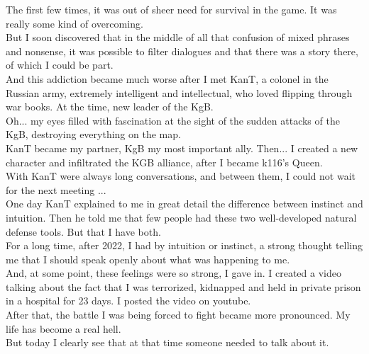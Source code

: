 \documentclass[11pt]{book}
\begin{document}
 \noindent The first few times, it was out of sheer need for survival in the game. It was really some kind of overcoming. \\

\noindent But I soon discovered that in the middle of all that confusion of mixed phrases and nonsense, it was possible to filter dialogues and that there was a story there, of which I could be part. \\

\noindent And this addiction became much worse after I met KanT, a colonel in the Russian army, extremely intelligent and intellectual, who loved flipping through war books. At the time, new leader of the KgB.  \\

\noindent Oh... my eyes filled with fascination at the sight of the sudden attacks of the KgB, destroying everything on the map. \\

\noindent KanT became my partner, KgB my most important ally. Then... I created a new character and infiltrated the KGB alliance, after I became k116's Queen. \\ 

\noindent With KanT were always long conversations, and between them, I could not wait for the next meeting ... \\

\noindent One day KanT explained to me in great detail the difference between instinct and intuition. Then he told me that few people had these two well-developed natural defense tools. But that I have both. \\

\noindent For a long time, after 2022, I had by intuition or instinct, a strong thought telling me that I should speak openly about what was happening to me. \\

\noindent And, at some point, these feelings were so strong, I gave in. I created a video talking about the fact that I was terrorized, kidnapped and held in private prison in a hospital for 23 days. I posted the video on youtube. \\

\noindent After that, the battle I was being forced to fight became more pronounced. My life has become a real hell. \\

\noindent But today I clearly see that at that time someone needed to talk about it. \\
\end{document}
